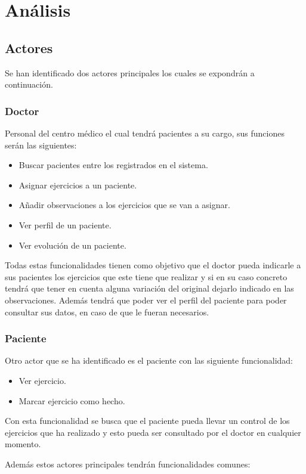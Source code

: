 \section{Análisis}
\subsection{Actores}
Se han identificado dos actores principales los cuales se expondrán a continuación.

\subsubsection{Doctor}
Personal del centro médico el cual tendrá pacientes a su cargo, sus funciones serán
las siguientes:
\begin{itemize}
    \item Buscar pacientes entre los registrados en el sistema.
    \item Asignar ejercicios a un paciente.
    \item Añadir observaciones a los ejercicios que se van a asignar.
    \item Ver perfil de un paciente.
    \item Ver evolución de un paciente.
\end{itemize}

Todas estas funcionalidades tienen como objetivo que el doctor pueda indicarle a sus
pacientes los ejercicios que este tiene que realizar y si en su caso concreto tendrá
que tener en cuenta alguna variación del original dejarlo indicado en las observaciones.
Además tendrá que poder ver el perfil del paciente para poder consultar sus datos, en caso
de que le fueran necesarios.

\subsubsection{Paciente}
Otro actor que se ha identificado es el paciente con las siguiente funcionalidad:
\begin{itemize}
    \item Ver ejercicio.
    \item Marcar ejercicio como hecho.
\end{itemize}

Con esta funcionalidad se busca que el paciente pueda llevar un control de los ejercicios
que ha realizado y esto pueda ser consultado por el doctor en cualquier momento.

\medskip
Además estos actores principales tendrán funcionalidades comunes:

